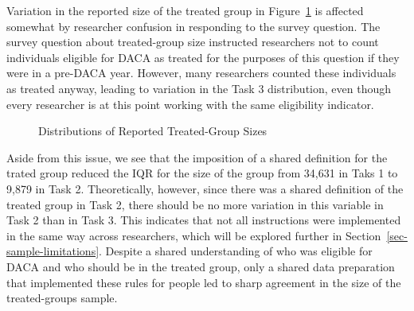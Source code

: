 \documentclass[
  letterpaper,
  DIV=11,
  numbers=noendperiod]{scrartcl}
\begin{document}
Variation in the reported size of the treated group in
Figure~\ref{fig-treated-group-distributions} is affected somewhat by
researcher confusion in responding to the survey question. The survey
question about treated-group size instructed researchers not to count
individuals eligible for DACA as treated for the purposes of this
question if they were in a pre-DACA year. However, many researchers
counted these individuals as treated anyway, leading to variation in the
Task 3 distribution, even though every researcher is at this point
working with the same eligibility indicator.

\begin{figure}


\caption{\label{fig-treated-group-distributions}Distributions of
Reported Treated-Group Sizes}

\end{figure}%

Aside from this issue, we see that the imposition of a shared definition
for the trated group reduced the IQR for the size of the group from
34,631 in Taks 1 to 9,879 in Task 2. Theoretically, however, since there
was a shared definition of the treated group in Task 2, there should be
no more variation in this variable in Task 2 than in Task 3. This
indicates that not all instructions were implemented in the same way
across researchers, which will be explored further in
Section~\ref{sec-sample-limitations}. Despite a shared understanding of
who was eligible for DACA and who should be in the treated group, only a
shared data preparation that implemented these rules for people led to
sharp agreement in the size of the treated-groups sample.
\end{document}
